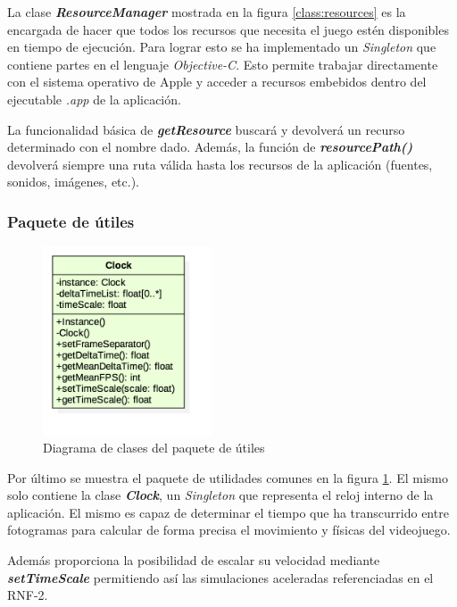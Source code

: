 La clase \textbf{\textit{ResourceManager}} mostrada en la figura \ref{class:resources} es la encargada de hacer que todos los recursos que necesita el juego estén disponibles en tiempo de ejecución. Para lograr esto se ha implementado un \textit{Singleton} que contiene partes en el lenguaje \textit{Objective-C}. Esto permite trabajar directamente con el sistema operativo de Apple y acceder a recursos embebidos dentro del ejecutable \textit{.app} de la aplicación.

\bigskip

La funcionalidad básica de \textbf{\textit{getResource}} buscará y devolverá un recurso determinado con el nombre dado. Además, la función de \textbf{\textit{resourcePath()}} devolverá siempre una ruta válida hasta los recursos de la aplicación (fuentes, sonidos, imágenes, etc.).

\subsubsection*{Paquete de útiles}

\begin{figure}
	\centerline{\includegraphics[width=5cm]{otros/UML/png/alld/png/utils__diagramaDeClases_utils_10.png}}
	\caption{Diagrama de clases del paquete de útiles}
	\label{class:utils}
\end{figure}

Por último se muestra el paquete de utilidades comunes en la figura \ref{class:utils}. El mismo solo contiene la clase \textbf{\textit{Clock}}, un \textit{Singleton} que representa el reloj interno de la aplicación. El mismo es capaz de determinar el tiempo que ha transcurrido entre fotogramas para calcular de forma precisa el movimiento y físicas del videojuego.

\bigskip

Además proporciona la posibilidad de escalar su velocidad mediante \textbf{\textit{setTimeScale}} permitiendo así las simulaciones aceleradas referenciadas en el RNF-2.


